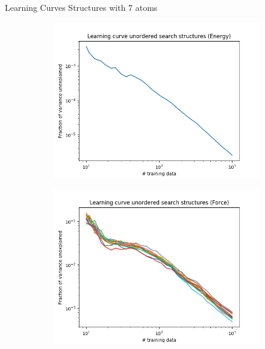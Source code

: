 \documentclass{beamer}
\begin{document}
\begin{frame}{Learning Curves}
Structures with 7 atoms
	\begin{figure}
		\centering
		\begin{subfigure}{0.5\textwidth}
			\centering
			\includegraphics[width=\linewidth]{N7energy_search_unordered}
			\caption*{}
		\end{subfigure}%
		\begin{subfigure}{0.5\textwidth}
			\centering
			\includegraphics[width=\linewidth]{N7force_search_unordered}
			\caption*{}
		\end{subfigure}
	\end{figure}
\end{frame}
\end{document}
